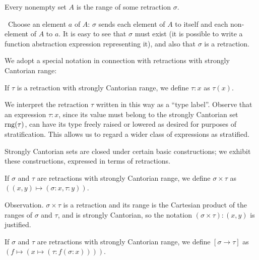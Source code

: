 \begin{thm}
 Every nonempty set $A$ is the range of some retraction
 $\sigma$.  
\end{thm}

\preuve\ Choose an element $a$ of $A$: $\sigma$ sends each
element of $A$ to itself and each non-element of $A$ to $a$.  It is
easy to see that $\sigma$ must exist (it is possible to write a
function abstraction expression representing it),
and also that $\sigma$ is a retraction.
\finpreuve

We adopt a special notation in connection with retractions with
strongly Cantorian range:

\begin{definition}
 If $\tau$ is a retraction with strongly Cantorian
 range, we define $\tau : x$ as $\tau(x)$.
\end{definition}

We interpret the retraction $\tau$ written in this way as a ``type
label''.  Observe that an expression $\tau : x$, since its value must belong
to the strongly Cantorian set $\mathop{\mathrm{rng}}(\tau)$, can have its type freely
raised or lowered as desired for purposes of
stratification.  This 
allows us to regard a wider class of expressions as
stratified.

Strongly Cantorian sets are closed under certain basic constructions;
we exhibit these constructions, expressed in terms of retractions.

\begin{definition}
 If $\sigma$ and $\tau$ are retractions with
 strongly Cantorian range, we define $\sigma
 \times \tau$ as $((x,y) \mapsto (\sigma : x,\tau :y))$.
\end{definition}

\begin{ThmEtc}{Observation.}
 $\sigma \times \tau$ is a retraction and its range
 is the Cartesian product of the ranges of $\sigma$
 and $\tau$, and is strongly Cantorian, so the notation $(\sigma \times
 \tau):(x,y)$ is justified.
\end{ThmEtc}

\begin{definition}
 If $\sigma$ and $\tau$ are retractions with
 strongly Cantorian range, we define $[\sigma \rightarrow \tau]$ as
 $(f \mapsto (x \mapsto (\tau: f(\sigma: x))))$.
\end{definition}

